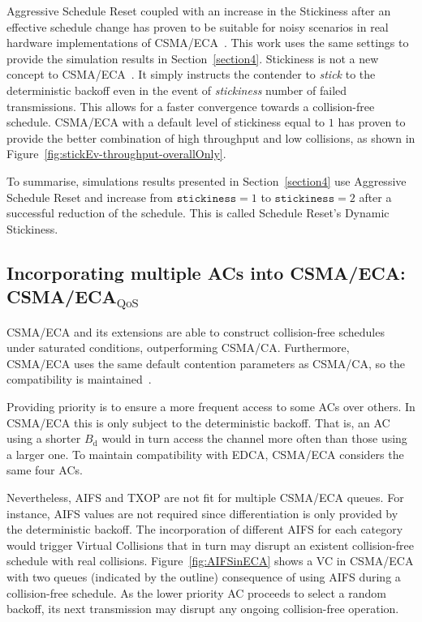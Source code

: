 \documentclass[a4paper]{article}
\begin{document}
Aggressive Schedule Reset coupled with an increase in the Stickiness after an effective schedule change has proven to be suitable for noisy scenarios in real hardware implementations of CSMA/ECA~\cite{sanabria2014high}. This work uses the same settings to provide the simulation results in Section~\ref{section4}. Stickiness is not a new concept to CSMA/ECA~\cite{barcelo2011tcf}. It simply instructs the contender to \emph{stick} to the deterministic backoff even in the event of \emph{stickiness} number of failed transmissions. This allows for a faster convergence towards a collision-free schedule. CSMA/ECA with a default level of stickiness equal to $1$ has proven to provide the better combination of high throughput and low collisions, as shown in Figure~\ref{fig:stickEv-throughput-overallOnly}. 

To summarise, simulations results presented in Section~\ref{section4} use Aggressive Schedule Reset and increase from ${\texttt{stickiness}}=1$ to ${\texttt{stickiness}}=2$ after a successful reduction of the schedule. This is called Schedule Reset's Dynamic Stickiness. 

\subsection{Incorporating multiple ACs into CSMA/ECA: CSMA/ECA$_{\text{QoS}}$}
CSMA/ECA and its extensions are able to construct collision-free schedules under saturated conditions, outperforming CSMA/CA. Furthermore, CSMA/ECA uses the same default contention parameters as CSMA/CA, so the compatibility is maintained~\cite{sanabria2014high}.

Providing priority is to ensure a more frequent access to some ACs over others. In CSMA/ECA this is only subject to the deterministic backoff. That is, an AC using a shorter $B_{\text{d}}$ would in turn access the channel more often than those using a larger one. To maintain compatibility with EDCA, CSMA/ECA considers the same four ACs.

Nevertheless, AIFS and TXOP are not fit for multiple CSMA/ECA queues. For instance, AIFS values are not required since differentiation is only provided by the deterministic backoff. The incorporation of different AIFS for each category would trigger Virtual Collisions that in turn may disrupt an existent collision-free schedule with real collisions. Figure~\ref{fig:AIFSinECA} shows a VC in CSMA/ECA with two queues (indicated by the outline) consequence of using AIFS during a collision-free schedule. As the lower priority AC proceeds to select a random backoff, its next transmission may disrupt any ongoing collision-free operation.
\end{document}
